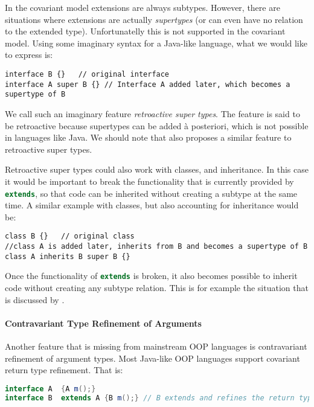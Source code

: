 In the covariant model extensions are always subtypes. However, 
there are situations where extensions are actually
\emph{supertypes} (or can even have no relation to the extended type). Unfortunatelly this is not supported in the
covariant model. Using some imaginary syntax for a Java-like language, 
what we would like to express is:

\begin{lstlisting}
interface B {}   // original interface
interface A super B {} // Interface A added later, which becomes a supertype of B
\end{lstlisting}

\noindent We call such an imaginary feature \emph{retroactive super types}. The
feature is said to be retroactive because supertypes can be added \`a
posteriori, which is not possible in languages like Java. We should note that
\citet{ostermann2008nominal} also proposes a similar feature to retroactive
super types.

Retroactive super types could also work with classes, and
inheritance. In this case it would be important to break the
functionality that is currently provided by \lstinline[language=java]{extends}, so that
code can be inherited without creating a subtype at the same time. 
A similar example with classes, but also accounting for inheritance 
would be:

\begin{lstlisting}
class B {}   // original class
//class A is added later, inherits from B and becomes a supertype of B
class A inherits B super B {}
\end{lstlisting}

\noindent Once the functionality of \lstinline[language=java]{extends} is broken, it also
becomes possible to inherit code without creating any subtype
relation. This is for example the situation that is discussed by \citet{cook1989inheritance}.

\paragraph{Contravariant Type Refinement of Arguments}
Another feature that is missing from mainstream OOP languages is 
contravariant refinement of argument types. Most Java-like OOP languages support covariant return type 
refinement. That is:

\begin{lstlisting}[language=java]
interface A  {A m();} 
interface B  extends A {B m();} // B extends and refines the return type of m() to a subtype
\end{lstlisting}

